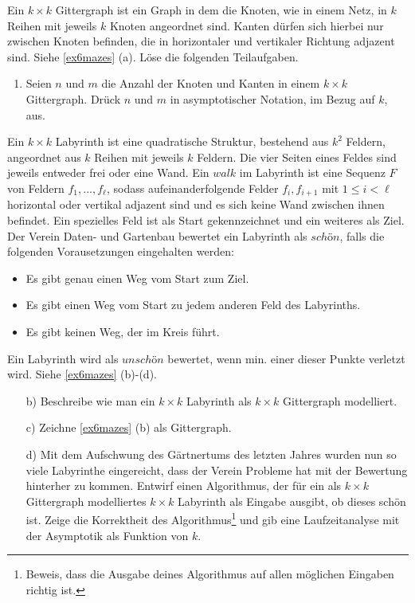 \documentclass{uebung_cs}
\begin{document}
\begin{aufgabe}
\begin{aufgabe}
	Ein $k\times k$ Gittergraph ist ein Graph in dem die Knoten, wie in einem Netz, in $k$ Reihen mit jeweils $k$ Knoten angeordnet sind.
	Kanten dürfen sich hierbei nur zwischen Knoten befinden, die in horizontaler und vertikaler Richtung adjazent sind.
	Siehe \ref{ex6mazes} (a).
	Löse die folgenden Teilaufgaben.
	\begin{enumerate}
		\item Seien $n$ und $m$ die Anzahl der Knoten und Kanten in einem $k\times k$ Gittergraph.
		Drück $n$ und $m$ in asymptotischer Notation, im Bezug auf $k$, aus.
	\end{enumerate}
	Ein $k\times k$ Labyrinth ist eine quadratische Struktur, bestehend aus $k^2$ Feldern, angeordnet aus $k$ Reihen mit jeweils $k$ Feldern.
	Die vier Seiten eines Feldes sind jeweils entweder frei oder eine Wand.
	Ein $walk$ im Labyrinth ist eine Sequenz $F$ von Feldern $f_1,..., f_\ell$, sodass aufeinanderfolgende Felder $f_i, f_{i+1}$ mit $1 \leq i < \ell$ horizontal oder vertikal adjazent sind und es sich keine Wand zwischen ihnen befindet.
	Ein spezielles Feld ist als Start gekennzeichnet und ein weiteres als Ziel.
	Der Verein \glqq Daten- und Gartenbau\grqq{} bewertet ein Labyrinth als $schön$, falls die folgenden Vorausetzungen eingehalten werden:
	\begin{itemize}
		\item Es gibt genau einen Weg vom Start zum Ziel.
		\item Es gibt einen Weg vom Start zu jedem anderen Feld des Labyrinths.
		\item Es gibt keinen Weg, der im Kreis führt.
	\end{itemize}
	Ein Labyrinth wird als $unschön$ bewertet, wenn min. einer dieser Punkte verletzt wird.
	Siehe \ref{ex6mazes} (b)-(d).
	\begin{enumerate}
		\item[b)] Beschreibe wie man ein $k\times k$ Labyrinth als $k\times k$ Gittergraph modelliert.
		\item[c)] Zeichne \ref{ex6mazes} (b) als Gittergraph.
		\item[d)] Mit dem Aufschwung des Gärtnertums des letzten Jahres wurden nun so viele Labyrinthe eingereicht, dass der Verein Probleme hat mit der Bewertung hinterher zu kommen.
		Entwirf einen Algorithmus, der für ein als $k\times k$ Gittergraph modelliertes $k\times k$ Labyrinth als Eingabe ausgibt, ob dieses schön ist.
		Zeige die Korrektheit des Algorithmus\footnote{Beweis, dass die Ausgabe deines Algorithmus auf allen möglichen Eingaben richtig ist.} und gib eine Laufzeitanalyse mit der Asymptotik als Funktion von $k$.
	\end{enumerate}
\end{aufgabe}


\end{aufgabe}
\end{document}
